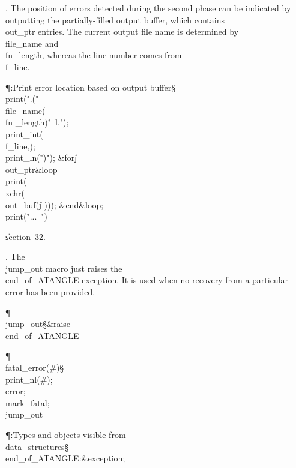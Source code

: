 . The position of errors detected during the second phase can be indicated
by outputting the partially-filled output buffer, which contains \\{out\_ptr}
entries. The current output file name is determined by \\{file\_name} and
\\{fn\_length}, whereas the line number comes from \\{f\_line}.

\Y\P\?\4:Print error location based on output buffer\X\S\?\6
\\{print}\?\1(\?\.{".("}\?\mathbin{\.\&}\?\\{file\_name}\?\1(\?\to\?\\{fn%
\_length}\?\2)\mathbin{\.\&}\?\.{"\ l."}\?\2)\?;\5
\\{print\_int}\?\1(\?\\{f\_line}\?,\?\2)\?;\5
\\{print\_ln}\?\1(\?\.{")"}\?\2)\?;\6
\1\&{for}\8\|j\?\in{}\?\to\?\\{out\_ptr}\8\&{loop}\6
\\{print}\?\1(\?\\{xchr}\?\1(\?\\{out\_buf}\?\1(\?\|j\?-\?\2)\2)\2)\?;%
\2\6
\&{end}\8\&{loop};\6
\\{print}\?\1(\?\.{"...\ "}\?\2)\?%
\par
\U section~32.\fi

. The \\{jump\_out} macro just raises the \\{end\_of\_ATANGLE} exception.
It is used when no recovery from a particular error has
been provided.

\Y\P\4\D\\{jump\_out}\?\S\?\&{raise}\8\\{end\_of\_ATANGLE}\par
\P\4\D\\{fatal\_error}\?\1(\?\#\?\2)\S\?\\{print\_nl}\?\1(\?\#\?\2)\?;\5
\\{error};\5
\\{mark\_fatal};\5
\\{jump\_out}\par
\Y\P\?\4:Types and objects visible from \\{data\_structures}\X\mathrel{+}\S%
\?\6
\\{end\_of\_ATANGLE}\?:\&{exception}\?;\par
\fi

